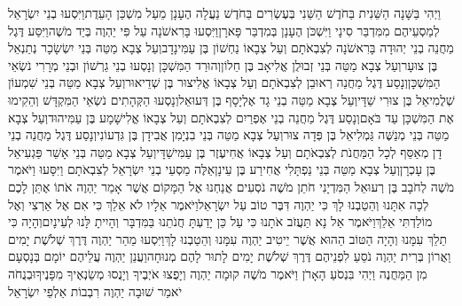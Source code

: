 \documentclass[../main/main.tex]{subfiles}
\begin{document}
\begin{multicols*}{\ncols}
וַיְהִי בַּשָּׁנָה הַשֵּׁנִית בַּחֹדֶשׁ הַשֵּׁנִי בְּעֶשְׂרִים בַּחֹדֶשׁ נַעֲלָה הֶעָנָן מֵעַל מִשְׁכַּן הָעֵדֻת\PreVerseSpace{}וַיִּסְעוּ בְנֵי יִשְׂרָאֵל לְמַסְעֵיהֶם מִמִּדְבַּר סִינָי וַיִּשְׁכֹּן הֶעָנָן בְּמִדְבַּר פָּארָן\PreVerseSpace{}וַיִּסְעוּ בָּרִאשֹׁנָה עַל פִּי יַהְוֶה בְּיַד מֹשֶׁה\PreVerseSpace{}וַיִּסַּע דֶּגֶל מַחֲנֵה בְנֵי יְהוּדָה בָּרִאשֹׁנָה לְצִבְאֹתָם וְעַל צְבָאוֹ נַחְשׁוֹן בֶּן עַמִּינָדָב\PreVerseSpace{}וְעַל צְבָא מַטֵּה בְּנֵי יִשְׂשָׂכָר נְתַנְאֵל בֶּן צוּעָר\PreVerseSpace{}וְעַל צְבָא מַטֵּה בְּנֵי זְבוּלֻן אֱלִיאָב בֶּן חֵלוֹן\PreVerseSpace{}וְהוּרַד הַמִּשְׁכָּן וְנָסְעוּ בְנֵי גֵרְשׁוֹן וּבְנֵי מְרָרִי נֹשְׂאֵי הַמִּשְׁכָּן\PreVerseSpace{}וְנָסַע דֶּגֶל מַחֲנֵה רְאוּבֵן לְצִבְאֹתָם וְעַל צְבָאוֹ אֱלִיצוּר בֶּן שְׁדֵיאוּר\PreVerseSpace{}וְעַל צְבָא מַטֵּה בְּנֵי שִׁמְעוֹן שְׁלֻמִיאֵל בֶּן צוּרִי שַׁדָּי\PreVerseSpace{}וְעַל צְבָא מַטֵּה בְנֵי גָד אֶלְיָסָף בֶּן דְּעוּאֵל\PreVerseSpace{}וְנָסְעוּ הַקְּהָתִים נֹשְׂאֵי הַמִּקְדָּשׁ וְהֵקִימוּ אֶת הַמִּשְׁכָּן עַד בֹּאָם\PreVerseSpace{}וְנָסַע דֶּגֶל מַחֲנֵה בְנֵי אֶפְרַיִם לְצִבְאֹתָם וְעַל צְבָאוֹ אֱלִישָׁמָע בֶּן עַמִּיהוּד\PreVerseSpace{}וְעַל צְבָא מַטֵּה בְּנֵי מְנַשֶּׁה גַּמְלִיאֵל בֶּן פְּדָה צוּר\PreVerseSpace{}וְעַל צְבָא מַטֵּה בְּנֵי בִנְיָמִן אֲבִידָן בֶּן גִּדְעוֹנִי\PreVerseSpace{}וְנָסַע דֶּגֶל מַחֲנֵה בְנֵי דָן מְאַסֵּף לְכָל הַמַּחֲנֹת לְצִבְאֹתָם וְעַל צְבָאוֹ אֲחִיעֶזֶר בֶּן עַמִּישַׁדָּי\PreVerseSpace{}וְעַל צְבָא מַטֵּה בְּנֵי אָשֵׁר פַּגְעִיאֵל בֶּן עָכְרָן\PreVerseSpace{}וְעַל צְבָא מַטֵּה בְּנֵי נַפְתָּלִי אֲחִירַע בֶּן עֵינָן\PreVerseSpace{}אֵלֶּה מַסְעֵי בְנֵי יִשְׂרָאֵל לְצִבְאֹתָם וַיִּסָּעוּ \ClosedSection{}וַיֹּאמֶר מֹשֶׁה לְחֹבָב בֶּן רְעוּאֵל הַמִּדְיָנִי חֹתֵן מֹשֶׁה נֹסְעִים אֲנַחְנוּ אֶל הַמָּקוֹם אֲשֶׁר אָמַר יַהְוֶה אֹתוֹ אֶתֵּן לָכֶם לְכָה אִתָּנוּ וְהֵטַבְנוּ לָךְ כִּי יַהְוֶה דִּבֶּר טוֹב עַל יִשְׂרָאֵל\PreVerseSpace{}וַיֹּאמֶר אֵלָיו לֹא אֵלֵךְ כִּי אִם אֶל אַרְצִי וְאֶל מוֹלַדְתִּי אֵלֵךְ\PreVerseSpace{}וַיֹּאמֶר אַל נָא תַּעֲזֹב אֹתָנוּ כִּי עַל כֵּן יָדַעְתָּ חֲנֹתֵנוּ בַּמִּדְבָּר וְהָיִיתָ לָּנוּ לְעֵינָיִם\PreVerseSpace{}וְהָיָה כִּי תֵלֵךְ עִמָּנוּ וְהָיָה הַטּוֹב הַהוּא אֲשֶׁר יֵיטִיב יַהְוֶה עִמָּנוּ וְהֵטַבְנוּ לָךְ\PreVerseSpace{}וַיִּסְעוּ מֵהַר יַהְוֶה דֶּרֶךְ שְׁלֹשֶׁת יָמִים וַאֲרוֹן בְּרִית יַהְוֶה נֹסֵעַ לִפְנֵיהֶם דֶּרֶךְ שְׁלֹשֶׁת יָמִים לָתוּר לָהֶם מְנוּחָה\PreVerseSpace{}וַעֲנַן יַהְוֶה עֲלֵיהֶם יוֹמָם בְּנָסְעָם מִן הַמַּחֲנֶה \ClosedSection{}וַיְהִי בִּנְסֹעַ הָאָרֹן וַיֹּאמֶר מֹשֶׁה קוּמָה יַהְוֶה וְיָפֻצוּ אֹיְבֶיךָ וְיָנֻסוּ מְשַׂנְאֶיךָ מִפָּנֶיךָ\PreVerseSpace{}וּבְנֻחֹה יֹאמַר שׁוּבָה יַהְוֶה רִבְבוֹת אַלְפֵי יִשְׂרָאֵל\OpenSection{}\par

\end{multicols*}
\end{document}
